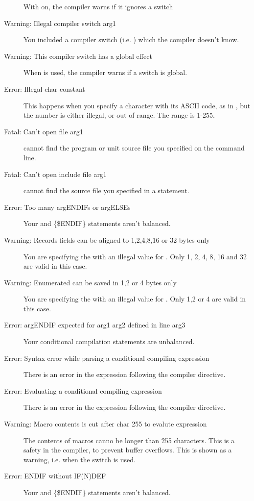 \begin{description}
 With  on, the compiler warns if it ignores a switch
\item [Warning: Illegal compiler switch arg1]
 You included a compiler switch (i.e. ) which the compiler
 doesn't know.
\item [Warning: This compiler switch has a global effect]
 When  is used, the compiler warns if a switch is global.
\item [Error: Illegal char constant]
 This happens when you specify a character with its ASCII code, as in
 , but the number is either illegal, or out of range. The range
 is 1-255.
\item [Fatal: Can't open file arg1]
 \fpc cannot find the program or unit source file you specified on the
 command line.
\item [Fatal: Can't open include file arg1]
 \fpc cannot find the source file you specified in a 
 statement.
\item [Error: Too many argENDIFs or argELSEs]
 Your  and {\{\$ENDIF\}} statements aren't balanced.
\item [Warning: Records fields can be aligned to 1,2,4,8,16 or 32 bytes only]
 You are specifying the  with an illegal value for
 . Only 1, 2, 4, 8, 16 and 32 are valid in this case.
\item [Warning: Enumerated can be saved in 1,2 or 4 bytes only]
 You are specifying the  with an illegal value for
 . Only 1,2 or 4 are valid in this case.
\item [Error: argENDIF expected for arg1 arg2 defined in line arg3]
 Your conditional compilation statements are unbalanced.
\item [Error: Syntax error while parsing a conditional compiling expression]
 There is an error in the expression following the  compiler
 directive.
\item [Error: Evaluating a conditional compiling expression]
 There is an error in the expression following the  compiler
 directive.
\item [Warning: Macro contents is cut after char 255 to evalute expression]
 The contents of macros canno be longer than 255 characters. This is a
 safety in the compiler, to prevent buffer overflows. This is shown as a
 warning, i.e. when the  switch is used.
\item [Error: ENDIF without IF(N)DEF]
 Your  and {\{\$ENDIF\}} statements aren't balanced.

\end{description}
